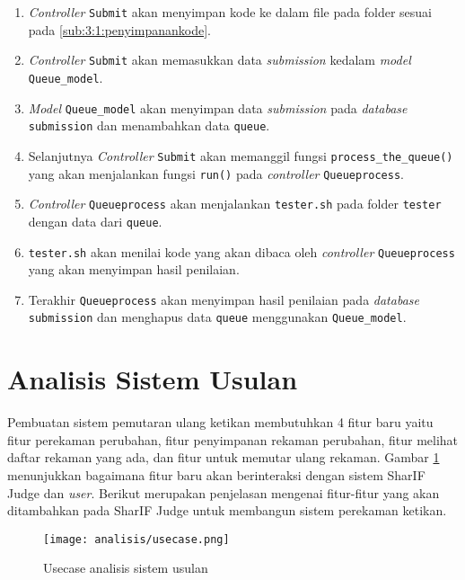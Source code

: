 \begin{enumerate}
	\item \textit{Controller} \verb|Submit| akan menyimpan kode ke dalam file pada folder sesuai pada \ref{sub:3:1:penyimpanankode}.
	\item \textit{Controller} \verb|Submit| akan memasukkan data \textit{submission} kedalam \textit{model} \verb|Queue_model|.
	\item \textit{Model} \verb|Queue_model| akan menyimpan data \textit{submission} pada \textit{database} \verb|submission| dan menambahkan data \verb|queue|.
	\item Selanjutnya \textit{Controller} \verb|Submit| akan memanggil fungsi \verb|process_the_queue()| yang akan menjalankan fungsi \verb|run()| pada \textit{controller} \verb|Queueprocess|.
	\item \textit{Controller} \verb|Queueprocess| akan menjalankan \verb|tester.sh| pada folder \verb|tester| dengan data dari \verb|queue|.
	\item \verb|tester.sh| akan menilai kode yang akan dibaca oleh \textit{controller} \verb|Queueprocess| yang akan menyimpan hasil penilaian.
	\item Terakhir \verb|Queueprocess| akan menyimpan hasil penilaian pada \textit{database} \verb|submission| dan menghapus data \verb|queue| menggunakan \verb|Queue_model|.
\end{enumerate}


\section{Analisis Sistem Usulan}
\label{sec:3:sistemusulan}

Pembuatan sistem pemutaran ulang ketikan membutuhkan 4 fitur baru yaitu fitur perekaman perubahan, fitur penyimpanan rekaman perubahan, fitur melihat daftar rekaman yang ada, dan fitur untuk memutar ulang rekaman. Gambar \ref{fig:3:usecase} menunjukkan bagaimana fitur baru akan berinteraksi dengan sistem SharIF Judge dan \textit{user}. Berikut merupakan penjelasan mengenai fitur-fitur yang akan ditambahkan pada SharIF Judge untuk membangun sistem perekaman ketikan.

\begin{figure}[H]
	\centering
	\texttt{[image: analisis/usecase.png]}
	\caption{Usecase analisis sistem usulan}
	\label{fig:3:usecase}
\end{figure}


